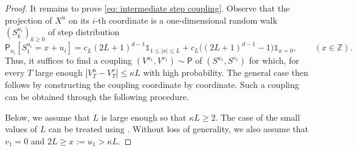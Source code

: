 \documentclass[11pt,a4paper]{article}
\numberwithin{equation}{section}
\theoremstyle{plain}
\theoremstyle{definition}
\begin{document}
\begin{proof}
It remains to prove \eqref{eq: intermediate step coupling}. Observe that the projection of $X^u$ on its $i$-th coordinate is a one-dimensional random walk $(S_k^{u_i})_{k\geq 0}$ of step distribution 
\begin{equation}\label{eq: law increments one dim walk}
	\mathsf P_{u_i}[S_{1}^{u_i}=x+u_i]=c_L (2L+1)^{d-1}\mathds{1}_{1\leq |x|\leq L}+c_L\Big((2L+1)^{d-1}-1\Big)\mathds{1}_{x=0}, \qquad (x\in \mathbb Z).
\end{equation}
Thus, it suffices to find a coupling $(V^{u_1},V^{v_1})\sim\mathsf{P}$ of $(S^{u_1},S^{v_1})$ for which, for every $T$ large enough $|V^{u}_T-V^{v}_T|\leq \kappa L$ with high probability. The general case then follows by constructing the coupling coordinate by coordinate. Such a coupling can be obtained through the following procedure. 

Below, we assume that $L$ is large enough so that $\kappa L\geq 2$. The case of the small values of $L$ can be treated using \cite[Lemma~2.4.3]{LawlerLimicRandomWalks2010}. Without loss of generality, we also assume that $v_1=0$ and $2L\geq x:=u_1>\kappa L$.


\end{proof}
\end{document}
